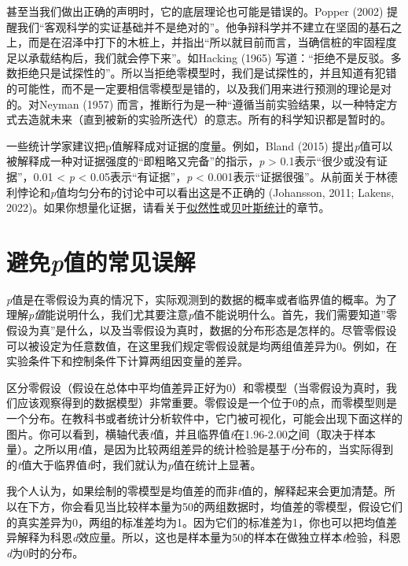 \documentclass[
  letterpaper,
  DIV=11,
  numbers=noendperiod]{scrreprt}
\begin{document}
甚至当我们做出正确的声明时，它的底层理论也可能是错误的。Popper (2002)
提醒我们``客观科学的实证基础并不是绝对的''。他争辩科学并不建立在坚固的基石之上，而是在沼泽中打下的木桩上，并指出``所以就目前而言，当确信桩的牢固程度足以承载结构后，我们就会停下来''。如Hacking
(1965)
写道：``拒绝不是反驳。多数拒绝只是试探性的''。所以当拒绝零模型时，我们是试探性的，并且知道有犯错的可能性，而不是一定要相信零模型是错的，以及我们用来进行预测的理论是对的。对Neyman
(1957)
而言，推断行为是一种``遵循当前实验结果，以一种特定方式去造就未来（直到被新的实验所迭代）的意志。所有的科学知识都是暂时的。

一些统计学家建议把p值解释成对证据的度量。例如，Bland (2015)
提出\emph{p}值可以被解释成一种对证据强度的``即粗略又完备''的指示，\emph{p}
\textgreater{} 0.1表示``很少或没有证据''，0.01 \textless{} \emph{p}
\textless{} 0.05表示``有证据''，\emph{p} \textless{}
0.001表示``证据很强''。从前面关于林德利悖论和\emph{p}值均匀分布的讨论中可以看出这是不正确的
(Johansson, 2011; Lakens,
2022)。如果你想量化证据，请看关于\protect\hyperlink{likelihoods}{似然性}或\protect\hyperlink{bayes}{贝叶斯统计}的章节。

\hypertarget{sec-misconceptions}{%
\section{\texorpdfstring{避免\emph{p}值的常见误解}{避免p值的常见误解}}\label{sec-misconceptions}}

\emph{p}值是在零假设为真的情况下，实际观测到的数据的概率或者临界值的概率。为了理解\emph{p值}能说明什么，我们尤其要注意\emph{p}值不能说明什么。首先，我们需要知道''零假设为真''是什么，以及当零假设为真时，数据的分布形态是怎样的。尽管零假设可以被设定为任意数值，在这里我们规定零假设就是均两组值差异为0。例如，在实验条件下和控制条件下计算两组因变量的差异。

区分零假设（假设在总体中平均值差异正好为0）和零模型（当零假设为真时，我们应该观察得到的数据模型）非常重要。零假设是一个位于0的点，而零模型则是一个分布。在教科书或者统计分析软件中，它门被可视化，可能会出现下面这样的图片。你可以看到，横轴代表\emph{t}值，并且临界值\emph{t}在1.96-2.00之间（取决于样本量）。之所以用\emph{t}值，是因为比较两组差异的统计检验是基于\emph{t}分布的，当实际得到的\emph{t}值大于临界值\emph{t}时，我们就认为\emph{p}值在统计上显著。

我个人认为，如果绘制的零模型是均值差的而非\emph{t}值的，解释起来会更加清楚。所以在下方，你会看见当比较样本量为50的两组数据时，均值差的零模型，假设它们的真实差异为0，两组的标准差均为1。因为它们的标准差为1，你也可以把均值差异解释为科恩\emph{d}效应量。所以，这也是样本量为50的样本在做独立样本\emph{t}检验，科恩\emph{d}为0时的分布。
\end{document}
